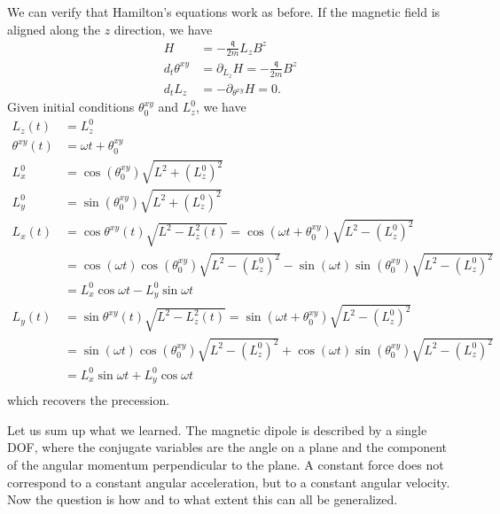 We can verify that Hamilton's equations work as before. If the magnetic field is aligned along the $z$ direction, we have
\begin{equation}
	\begin{aligned}
		H &= - \frac{\mathfrak{q}}{2m} L_z B^z \\
		d_t \theta^{xy} &= \partial_{L_z} H = - \frac{\mathfrak{q}}{2m} B^z \\
		d_t L_z &= - \partial_{\theta^{xy}} H = 0.
	\end{aligned}
\end{equation}
Given initial conditions $\theta^{xy}_0$ and $L_z^0$, we have
\begin{equation}
	\begin{aligned}
		L_z(t) &= L_z^0 \\
		\theta^{xy}(t) &= \omega t + \theta^{xy}_0 \\
		L_x^0 &= \cos(\theta^{xy}_0)\sqrt{L^2 + (L_z^0)^2} \\
		L_y^0 &= \sin(\theta^{xy}_0)\sqrt{L^2 + (L_z^0)^2} \\
		L_x(t) &= \cos\theta^{xy}(t) \sqrt{L^2 - L_z^2(t)} = \cos(\omega t + \theta^{xy}_0) \sqrt{L^2 - (L_z^0)^2} \\
		&= \cos(\omega t)\cos(\theta^{xy}_0) \sqrt{L^2 - (L_z^0)^2} - \sin(\omega t)\sin(\theta^{xy}_0) \sqrt{L^2 - (L_z^0)^2} \\
		&= L_x^0 \cos \omega t - L_y^0 \sin \omega t \\
		L_y(t) &= \sin\theta^{xy}(t) \sqrt{L^2 - L_z^2(t)} = \sin(\omega t + \theta^{xy}_0) \sqrt{L^2 - (L_z^0)^2} \\
		&= \sin(\omega t)\cos(\theta^{xy}_0) \sqrt{L^2 - (L_z^0)^2} + \cos(\omega t)\sin(\theta^{xy}_0) \sqrt{L^2 - (L_z^0)^2} \\
		&= L_x^0 \sin \omega t + L_y^0 \cos \omega t \\
	\end{aligned}
\end{equation}
which recovers the precession.

Let us sum up what we learned. The magnetic dipole is described by a single DOF, where the conjugate variables are the angle on a plane and the component of the angular momentum perpendicular to the plane. A constant force does not correspond to a constant angular acceleration, but to a constant angular velocity. Now the question is how and to what extent this can all be generalized.


